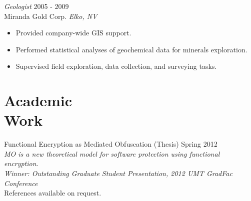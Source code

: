 \documentclass[line,margin]{res}
\begin{document}
\begin{resume}
        {\sl Geologist} \hfill 2005 - 2009 \\
        Miranda Gold Corp. \hfill {\sl Elko, NV}
        \begin{itemize}  \itemsep -2pt %
            \item Provided company-wide GIS support.
            \item Performed statistical analyses of geochemical data for minerals exploration.
            \item Supervised field exploration, data collection, and surveying tasks.
        \end{itemize}

    
\section{\sc Academic\\ Work}

        Functional Encryption as Mediated Obfuscation (Thesis) \hfill Spring 2012\\
            \emph{MO is a new theoretical model for software protection using functional encryption. \\
            Winner: Outstanding Graduate Student Presentation, 2012 UMT GradFac Conference}\\

References available on request.
\end{resume}
\end{document}
